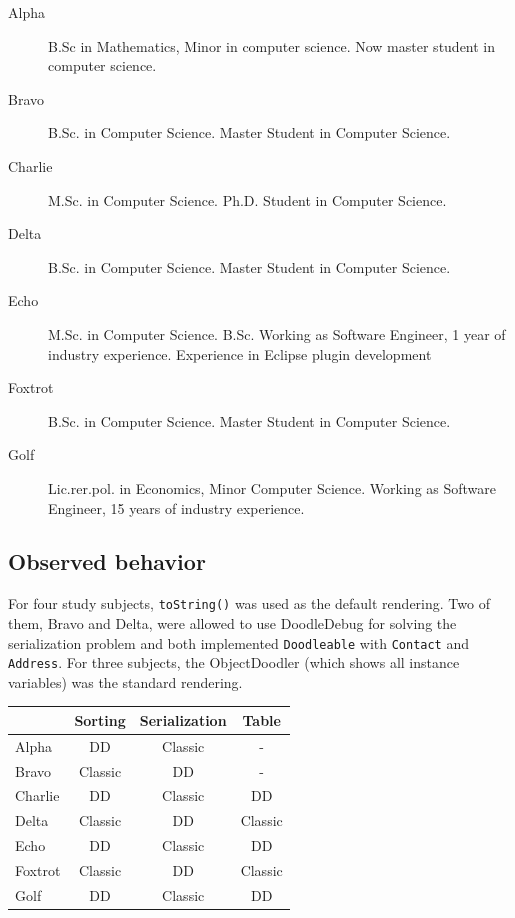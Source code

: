 \documentclass[english]{scrartcl}
\begin{document}
\begin{description}
\item [{Alpha}] B.Sc in Mathematics, Minor in computer science. Now master student in computer science. %
\item [{Bravo}] B.Sc. in Computer Science. Master Student  in Computer Science.
\item [{Charlie}] M.Sc. in Computer Science. Ph.D. Student in Computer Science.
\item [{Delta}] B.Sc. in Computer Science. Master Student  in Computer Science.
\item [{Echo}] M.Sc. in Computer Science. B.Sc. Working as Software Engineer, 1 year of industry experience. Experience in Eclipse plugin development
\item [{Foxtrot}] B.Sc. in Computer Science. Master Student  in Computer Science.
\item [{Golf}] Lic.rer.pol. in Economics, Minor Computer Science. Working as Software Engineer, 15 years of industry experience. %
\end{description}

\subsection{Observed behavior}
For four study subjects, \texttt{toString()} was used as the default rendering.
Two of them, Bravo and Delta, were allowed to use DoodleDebug for solving the serialization problem and both implemented \texttt{Doodleable} with \texttt{Contact} and \texttt{Address}.
For three subjects, the ObjectDoodler (which shows all instance variables) was the standard rendering.

\begin{tabular}{l | c c c}
 & \textbf{Sorting} & \textbf{Serialization} & \textbf{Table} \\
\hline
Alpha & DD & Classic & - \\
Bravo & Classic & DD & - \\
Charlie & DD & Classic & DD \\
Delta & Classic & DD & Classic \\
Echo & DD & Classic & DD \\
Foxtrot & Classic & DD & Classic \\
Golf & DD & Classic & DD \\
\end{tabular}
\end{document}
